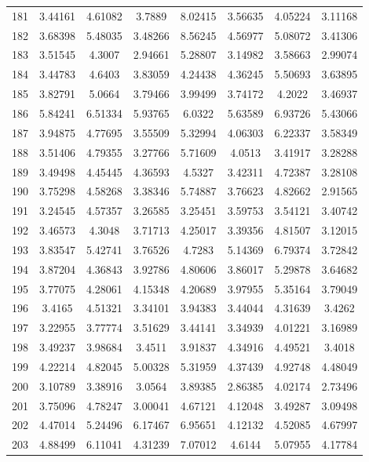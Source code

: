 \begin{center}
\begin{longtable}{cccccccc}
181 & 3.44161 & 4.61082 & 3.7889 & 8.02415 & 3.56635 & 4.05224 & 3.11168\\
182 & 3.68398 & 5.48035 & 3.48266 & 8.56245 & 4.56977 & 5.08072 & 3.41306\\
183 & 3.51545 & 4.3007 & 2.94661 & 5.28807 & 3.14982 & 3.58663 & 2.99074\\
184 & 3.44783 & 4.6403 & 3.83059 & 4.24438 & 4.36245 & 5.50693 & 3.63895\\
185 & 3.82791 & 5.0664 & 3.79466 & 3.99499 & 3.74172 & 4.2022 & 3.46937\\
186 & 5.84241 & 6.51334 & 5.93765 & 6.0322 & 5.63589 & 6.93726 & 5.43066\\
187 & 3.94875 & 4.77695 & 3.55509 & 5.32994 & 4.06303 & 6.22337 & 3.58349\\
188 & 3.51406 & 4.79355 & 3.27766 & 5.71609 & 4.0513 & 3.41917 & 3.28288\\
189 & 3.49498 & 4.45445 & 4.36593 & 4.5327 & 3.42311 & 4.72387 & 3.28108\\
190 & 3.75298 & 4.58268 & 3.38346 & 5.74887 & 3.76623 & 4.82662 & 2.91565\\
191 & 3.24545 & 4.57357 & 3.26585 & 3.25451 & 3.59753 & 3.54121 & 3.40742\\
192 & 3.46573 & 4.3048 & 3.71713 & 4.25017 & 3.39356 & 4.81507 & 3.12015\\
193 & 3.83547 & 5.42741 & 3.76526 & 4.7283 & 5.14369 & 6.79374 & 3.72842\\
194 & 3.87204 & 4.36843 & 3.92786 & 4.80606 & 3.86017 & 5.29878 & 3.64682\\
195 & 3.77075 & 4.28061 & 4.15348 & 4.20689 & 3.97955 & 5.35164 & 3.79049\\
196 & 3.4165 & 4.51321 & 3.34101 & 3.94383 & 3.44044 & 4.31639 & 3.4262\\
197 & 3.22955 & 3.77774 & 3.51629 & 3.44141 & 3.34939 & 4.01221 & 3.16989\\
198 & 3.49237 & 3.98684 & 3.4511 & 3.91837 & 4.34916 & 4.49521 & 3.4018\\
199 & 4.22214 & 4.82045 & 5.00328 & 5.31959 & 4.37439 & 4.92748 & 4.48049\\
200 & 3.10789 & 3.38916 & 3.0564 & 3.89385 & 2.86385 & 4.02174 & 2.73496\\
201 & 3.75096 & 4.78247 & 3.00041 & 4.67121 & 4.12048 & 3.49287 & 3.09498\\
202 & 4.47014 & 5.24496 & 6.17467 & 6.95651 & 4.12132 & 4.52085 & 4.67997\\
203 & 4.88499 & 6.11041 & 4.31239 & 7.07012 & 4.6144 & 5.07955 & 4.17784\\

\end{longtable}
\end{center}
